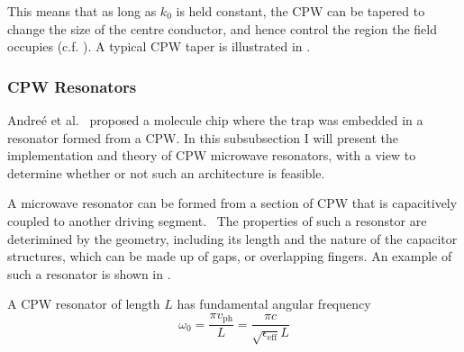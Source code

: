 This means that as long as $k_0$ is held constant,
the CPW can be tapered to change the size of the centre conductor, and hence
control the region the field occupies (c.f. ).
A typical CPW taper is illustrated in
.~

\begin{figure}
  \caption{
  }
  \label{experiment:fig:CPWtaper}
\end{figure}

\subsubsection{CPW Resonators}

Andre\'e et al.~\cite{Andre2006} proposed a molecule chip where the trap was
embedded in a resonator formed from a CPW. In this subsubsection I will present
the implementation and theory of CPW microwave resonators, with a view to
determine whether or not such an architecture is feasible.

A microwave resonator can be formed from a section of CPW that is capacitively
coupled to another driving segment.~\cite{Day2003} The properties of such a
resonstor are deterimined by the geometry, including its length and the nature
of the capacitor structures, which can be made up of gaps, or overlapping
fingers. An example of such a resonator is shown in
.~\cite{doi:10.1063/1.3010859} 

\begin{figure}
  \caption{
  }
  \label{experiment:fig:resonator}
\end{figure}

A CPW resonator of length $L$ has fundamental angular frequency
\begin{equation}
  \omega_0 = \frac{\pi v_\mathrm{ph}}{L} = \frac{\pi
  c}{\sqrt{\epsilon_\text{eff}} L}
\end{equation}

